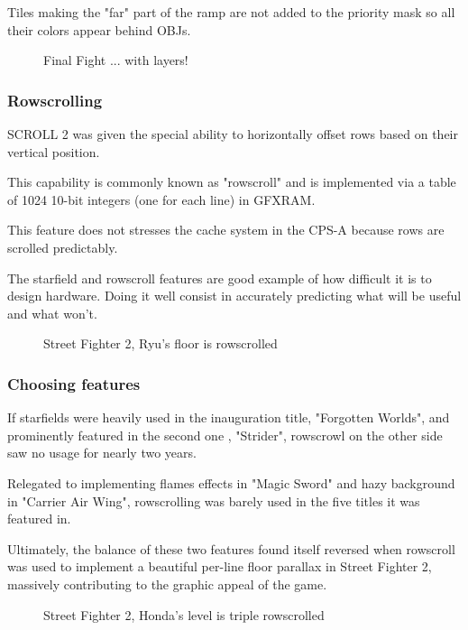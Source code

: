 Tiles making the "far" part of the ramp are not added to the priority mask so all their colors appear behind OBJs.

\vfill
\begin{figure}[!b]
 \caption*{Final Fight ... with layers!}%
 \end{figure}%
\pagebreak

\subsubsection{Rowscrolling}
SCROLL 2 was given the special ability to horizontally offset rows based on their vertical position. 

This capability is commonly known as "rowscroll" and is implemented via a table of 1024 10-bit integers (one for each line) in GFXRAM.

This feature does not stresses the cache system in the CPS-A because rows are scrolled predictably.


The starfield and rowscroll features are good example of how difficult it is to design hardware. Doing it well consist in accurately predicting what will be useful and what won't. 

\vfill
\begin{figure}[!b]
 \caption*{Street Fighter 2, Ryu's floor is rowscrolled}%
 \end{figure}%
\pagebreak

\subsubsection{Choosing features}


If starfields were heavily used in the inauguration title, "Forgotten Worlds", and prominently featured in the second one , "Strider", rowscrowl on the other side saw no usage for nearly two years. 

Relegated to implementing flames effects in "Magic Sword" and hazy background in "Carrier Air Wing", rowscrolling was barely used in the five titles\cite{mame_cps1_video} it was featured in.

Ultimately, the balance of these two features found itself reversed when rowscroll was used to implement a beautiful per-line floor parallax in Street Fighter 2, massively contributing to the graphic appeal of the game.


\vfill
\begin{figure}[!b]
 \caption*{Street Fighter 2, Honda's level is triple rowscrolled}%
 \end{figure}%
\pagebreak







